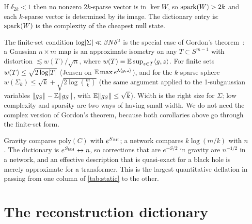 \begin{remark}
If $\delta_{2k}<1$ then no nonzero $2k$-sparse vector is in $\ker W$, so $\operatorname{spark}(W)>2k$ and each $k$-sparse vector
is determined by its image. The dictionary entry is: $\operatorname{spark}(W)$ is the complexity of the cheapest null state.
\end{remark}

\begin{remark}\label{rem:width}\cited
The finite-set condition $\log\lvert \Sigma\rvert\ll\beta N\delta^2$ is the special case of Gordon's
theorem~\cite{Gordon,Vershynin}: a Gaussian $n\times m$ map is an approximate isometry on any $T\subset S^{m-1}$
with distortion $\lesssim w(T)/\sqrt n$, where $w(T)=\mathbb E\sup_{z\in T}\langle g,z\rangle$. For finite sets $w(T)\le\sqrt{2\log\lvert T\rvert}$ (Jensen on $\mathbb E\max e^{\lambda\langle g,z\rangle}$), and for the $k$-sparse sphere
$w(\Sigma_k)\le\sqrt k+\sqrt{2\log\binom mk}$ (the same argument applied to the 1-subgaussian variables
$\lVert g_S\rVert-\mathbb E\lVert g_S\rVert$, with $\mathbb E\lVert g_S\rVert\le\sqrt k$). Width is the right size for $\Sigma$; low complexity and
sparsity are two ways of having small width. We do not need the complex version of Gordon's theorem, because both
corollaries above go through the finite-set form.
\end{remark}

\begin{remark}
Gravity compares $\mathrm{poly}(C)$ with $e^{S_{\rm BH}}$; a network compares $k\log(m/k)$ with $n$. The dictionary
is $e^{S_{\rm BH}}\leftrightarrow n$, so corrections that are $e^{-S/2}$ in gravity are $n^{-1/2}$ in a network,
and an effective description that is quasi-exact for a black hole is merely approximate for a transformer. This is
the largest quantitative deflation in passing from one column of \cref{tab:static} to the other.
\end{remark}

\section{The reconstruction dictionary}\label{sec:dictionary}

